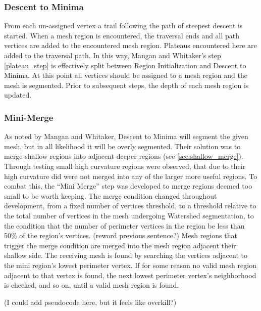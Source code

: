 \subsubsection{Descent to Minima}
From each un-assigned vertex a trail following the path of steepest descent is started.
When a mesh region is encountered, the traversal ends and all path vertices are added to the encountered mesh region.
Plateaus encountered here are added to the traversal path.
In this way, Mangan and Whitaker's step \ref{plateau_step} is effectively split between Region Initialization and Descent to Minima.
At this point all vertices should be assigned to a mesh region and the mesh is segmented.
Prior to subsequent steps, the depth of each mesh region is updated.

\subsubsection{Mini-Merge}\label{sec:mini_merge}
As noted by Mangan and Whitaker, Descent to Minima will segment the given mesh, but in all likelihood it will be overly segmented.
Their solution was to merge shallow regions into adjacent deeper regions (see \ref{sec:shallow_merge}).
Through testing small high curvature regions were observed, that due to their high curvature did were not merged into any of the larger more useful regions.
To combat this, the ``Mini Merge'' step was developed to merge regions deemed too small to be worth keeping.
The merge condition changed throughout development, from a fixed number of vertices threshold, to a threshold relative to the total number of vertices in the mesh undergoing Watershed segmentation, to the condition that the number of perimeter vertices in the region be less than 50\% of the region's vertices.
(reword previous sentence?)
Mesh regions that trigger the merge condition are merged into the mesh region adjacent their shallow side.
The receiving mesh is found by searching the vertices adjacent to the mini region's lowest perimeter vertex.
If for some reason no valid mesh region adjacent to that vertex is found, the next lowest perimeter vertex's neighborhood is checked, and so on, until a valid mesh region is found.

(I could add pseudocode here, but it feels like overkill?)

